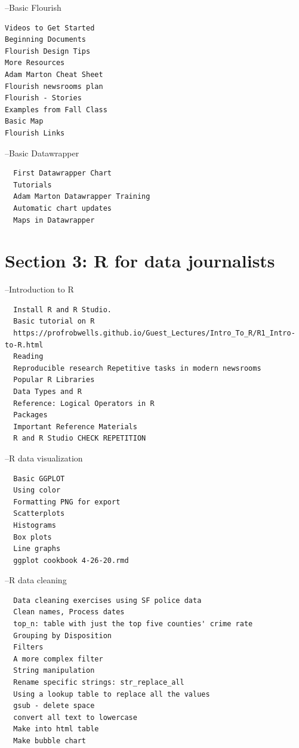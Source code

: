 \documentclass[]{book}
\begin{document}
--Basic Flourish

\begin{verbatim}
Videos to Get Started
Beginning Documents
Flourish Design Tips
More Resources
Adam Marton Cheat Sheet
Flourish newsrooms plan
Flourish - Stories
Examples from Fall Class
Basic Map
Flourish Links
\end{verbatim}

--Basic Datawrapper

\begin{verbatim}
  First Datawrapper Chart
  Tutorials
  Adam Marton Datawrapper Training
  Automatic chart updates
  Maps in Datawrapper
\end{verbatim}

\hypertarget{section-3-r-for-data-journalists}{%
\section{Section 3: R for data journalists}\label{section-3-r-for-data-journalists}}

--Introduction to R

\begin{verbatim}
  Install R and R Studio.
  Basic tutorial on R
  https://profrobwells.github.io/Guest_Lectures/Intro_To_R/R1_Intro-to-R.html
  Reading
  Reproducible research Repetitive tasks in modern newsrooms
  Popular R Libraries
  Data Types and R
  Reference: Logical Operators in R
  Packages
  Important Reference Materials
  R and R Studio CHECK REPETITION
\end{verbatim}

--R data visualization

\begin{verbatim}
  Basic GGPLOT
  Using color
  Formatting PNG for export
  Scatterplots
  Histograms
  Box plots
  Line graphs
  ggplot cookbook 4-26-20.rmd
\end{verbatim}

--R data cleaning

\begin{verbatim}
  Data cleaning exercises using SF police data  
  Clean names, Process dates  
  top_n: table with just the top five counties' crime rate  
  Grouping by Disposition   
  Filters   
  A more complex filter   
  String manipulation   
  Rename specific strings: str_replace_all   
  Using a lookup table to replace all the values   
  gsub - delete space   
  convert all text to lowercase   
  Make into html table   
  Make bubble chart   
  
\end{verbatim}
\end{document}
